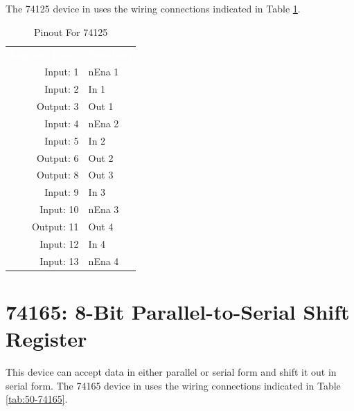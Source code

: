 The 74125 device in \LE uses the wiring connections indicated in Table \ref{tab:50-74125}.

\begin{table}[H]
	\sffamily
	\newcommand{\head}[1]{\textcolor{white}{\textbf{#1}}}		
	\begin{center}
		\begin{tabular}{rl} 
			\rowcolor{black!75}
			\head{Logisim Label} & \head{Function} \\
			Input: 1   & nEna 1 \\
			Input: 2   & In 1  \\
			Output: 3  & Out 1 \\
			Input: 4   & nEna 2 \\
			Input: 5   & In 2  \\
			Output: 6  & Out 2 \\
			Output: 8  & Out 3 \\
			Input: 9   & In 3  \\
			Input: 10  & nEna 3 \\
			Output: 11 & Out 4 \\
			Input: 12  & In 4  \\
			Input: 13  & nEna 4 \\
		\end{tabular}
	\end{center}
	\caption{Pinout For 74125}
	\label{tab:50-74125}
\end{table}

\section{74165: 8-Bit Parallel-to-Serial Shift Register}

This device can accept data in either parallel or serial form and shift it out in serial form. The 74165 device in \LE uses the wiring connections indicated in Table \ref{tab:50-74165}.


